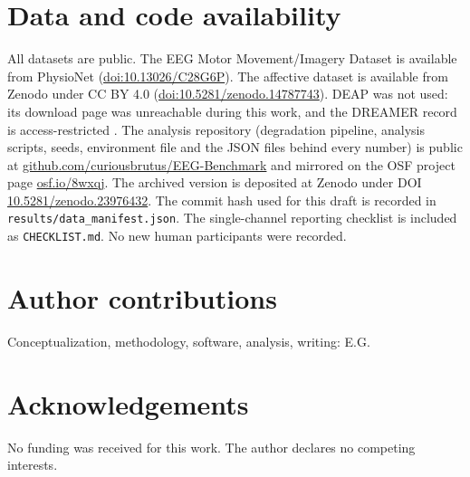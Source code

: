 \documentclass[11pt,a4paper,twocolumn]{article}
\begin{document}
\section*{Data and code availability}
All datasets are public. The EEG Motor Movement/Imagery Dataset is available from
PhysioNet (\href{https://doi.org/10.13026/C28G6P}{doi:10.13026/C28G6P}). The affective
dataset is available from Zenodo under CC BY 4.0
(\href{https://doi.org/10.5281/zenodo.14787743}{doi:10.5281/zenodo.14787743}). DEAP was
not used: its download page was unreachable during this work, and the DREAMER record is
access-restricted \cite{katsigiannis2018dreamer}. The analysis repository (degradation pipeline, analysis scripts,
seeds, environment file and the JSON files behind every number) is public at
\href{https://github.com/curiousbrutus/EEG-Benchmark}{github.com/curiousbrutus/EEG-Benchmark}
and mirrored on the OSF project page \href{https://osf.io/8wxqj/}{osf.io/8wxqj}. The
archived version is deposited at Zenodo under DOI
\href{https://doi.org/10.5281/zenodo.23976432}{10.5281/zenodo.23976432}. The commit hash
used for this draft is recorded in \texttt{results/data\_manifest.json}. The single-channel
reporting checklist is included as \texttt{CHECKLIST.md}. No new human participants were
recorded.

\section*{Author contributions}
Conceptualization, methodology, software, analysis, writing: E.G.

\section*{Acknowledgements}
No funding was received for this work. The author declares no competing interests.



\end{document}
